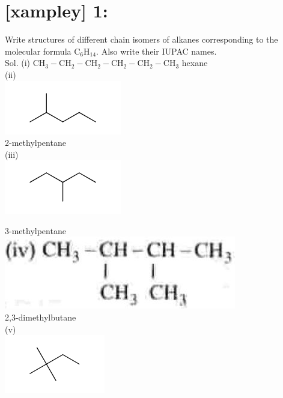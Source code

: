 \documentclass[10pt]{article}
\begin{document}
\section*{[xampley] 1:}
Write structures of different chain isomers of alkanes corresponding to the molecular formula $\mathrm{C}_{6} \mathrm{H}_{14}$. Also write their IUPAC names.\\
Sol. (i) $\mathrm{CH}_{3}-\mathrm{CH}_{2}-\mathrm{CH}_{2}-\mathrm{CH}_{2}-\mathrm{CH}_{2}-\mathrm{CH}_{3}$ hexane\\
(ii)\\
\includegraphics{smile-43933653f7fe021f5a979da65c469acb8b29d0a4}\\
2-methylpentane\\
(iii)\\
\includegraphics{smile-8e965e2f0f25655a523f00ed5edc384d39e65af5}

3-methylpentane\\
\includegraphics[max width=\textwidth, center]{2025_01_28_8470952b98110cec3aabg-218(4)}\\
2,3-dimethylbutane\\
(v)\\
\includegraphics{smile-48789d8c7f1c0d59583983386bb7e3162f5478ce}
\end{document}
